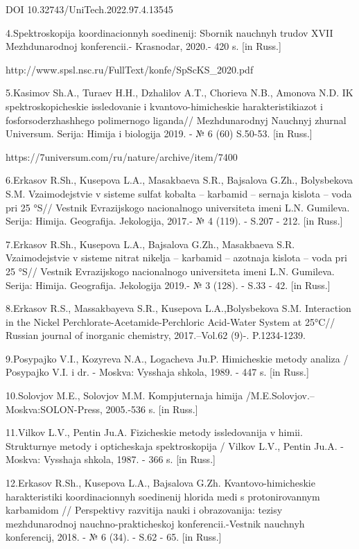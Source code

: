 DOI 10.32743/UniTech.2022.97.4.13545

4.Spektroskopija koordinacionnyh soedinenij: Sbornik nauchnyh trudov
XVII Mezhdunarodnoj konferencii.- Krasnodar, 2020.- 420 s. {[}in
Russ.{]}

http://www.spsl.nsc.ru/FullText/konfe/SpScKS\_2020.pdf

5.Kasimov Sh.A., Turaev H.H., Dzhalilov A.T., Chorieva N.B., Amonova
N.D. IK spektroskopicheskie issledovanie i kvantovo-himicheskie
harakteristikiazot i fosforsoderzhashhego polimernogo liganda//
Mezhdunarodnyj Nauchnyj zhurnal Universum. Serija: Himija i biologija
2019. - № 6 (60) S.50-53. {[}in Russ.{]}

https://7universum.com/ru/nature/archive/item/7400

6.Erkasov R.Sh., Kusepova L.A., Masakbaeva S.R., Bajsalova G.Zh.,
Bolysbekova S.M. Vzaimodejstvie v sisteme sul\textquotesingle fat
kobal\textquotesingle ta -- karbamid -- sernaja kislota -- voda pri 25
°S// Vestnik Evrazijskogo nacional\textquotesingle nogo universiteta
imeni L.N. Gumileva. Serija: Himija. Geografija. Jekologija, 2017.- № 4
(119). - S.207 - 212. {[}in Russ.{]}

7.Erkasov R.Sh., Kusepova L.A., Bajsalova G.Zh., Masakbaeva S.R.
Vzaimodejstvie v sisteme nitrat nikelja -- karbamid -- azotnaja kislota
-- voda pri 25 °S// Vestnik Evrazijskogo nacional\textquotesingle nogo
universiteta imeni L.N. Gumileva. Serija: Himija. Geografija. Jekologija
2019.- № 3 (128). - S.33 - 42. {[}in Russ.{]}

8.Erkasov R.S., Massakbayeva S.R., Kusepova L.A.,Bolysbekova S.M.
Interaction in the Nickel Perchlorate-Acetamide-Perchloric Acid-Water
System at 25°C// Russian journal of inorganic chemistry, 2017.--Vol.62
(9)-. P.1234-1239.

9.Posypajko V.I., Kozyreva N.A., Logacheva Ju.P. Himicheskie metody
analiza / Posypajko V.I. i dr. - Moskva: Vysshaja shkola, 1989. - 447 s.
{[}in Russ.{]}

10.Solov\textquotesingle jov M.E., Solov\textquotesingle jov M.M.
Komp\textquotesingle juternaja himija
/M.E.Solov\textquotesingle jov.--Moskva:SOLON-Press, 2005.-536 s. {[}in
Russ.{]}

11.Vilkov L.V., Pentin Ju.A. Fizicheskie metody issledovanija v himii.
Strukturnye metody i opticheskaja spektroskopija / Vilkov L.V., Pentin
Ju.A. - Moskva: Vysshaja shkola, 1987. - 366 s. {[}in Russ.{]}

12.Erkasov R.Sh., Kusepova L.A., Bajsalova G.Zh. Kvantovo-himicheskie
harakteristiki koordinacionnyh soedinenij hlorida medi s protonirovannym
karbamidom // Perspektivy razvitija nauki i obrazovanija: tezisy
mezhdunarodnoj nauchno-prakticheskoj konferencii.-Vestnik nauchnyh
konferencij, 2018. - № 6 (34). - S.62 - 65. {[}in Russ.{]}

